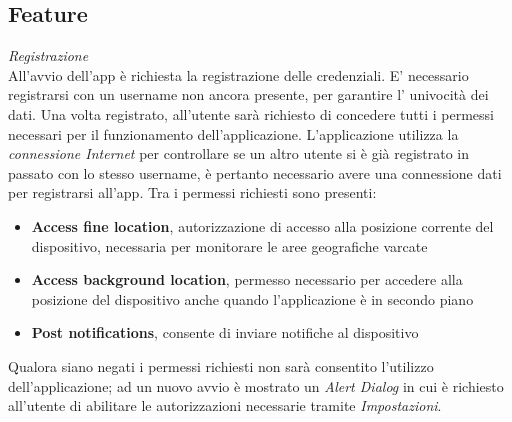 \documentclass{article}
\begin{document}
    \newpage
    \subsection*{Feature}
    \textit{Registrazione} \vspace*{7pt}\\
    All'avvio dell'app è richiesta la registrazione delle credenziali. E' necessario registrarsi con un username non ancora presente, per garantire l' univocità dei dati. Una volta registrato, all'utente sarà richiesto di concedere tutti i permessi necessari per il funzionamento dell'applicazione. L'applicazione utilizza la \textit{connessione Internet} per controllare se un altro utente si è già registrato in passato con lo stesso username, è pertanto necessario avere una connessione dati per registrarsi all'app.
    Tra i permessi richiesti sono presenti:
    \begin{itemize}
        \renewcommand{\labelitemi}{-}
        \item \textbf{Access fine location}, autorizzazione di accesso alla posizione corrente del dispositivo, necessaria per monitorare le aree geografiche varcate
        \item \textbf{Access background location}, permesso necessario per accedere alla posizione del dispositivo anche quando l'applicazione è in secondo piano
        \item \textbf{Post notifications}, consente di inviare notifiche al dispositivo
    \end{itemize}
    Qualora siano negati i permessi richiesti non sarà consentito l'utilizzo dell'applicazione; ad un nuovo avvio è mostrato un \textit{Alert Dialog} in cui è richiesto all'utente di abilitare le autorizzazioni necessarie tramite \textit{Impostazioni}.
\end{document}

